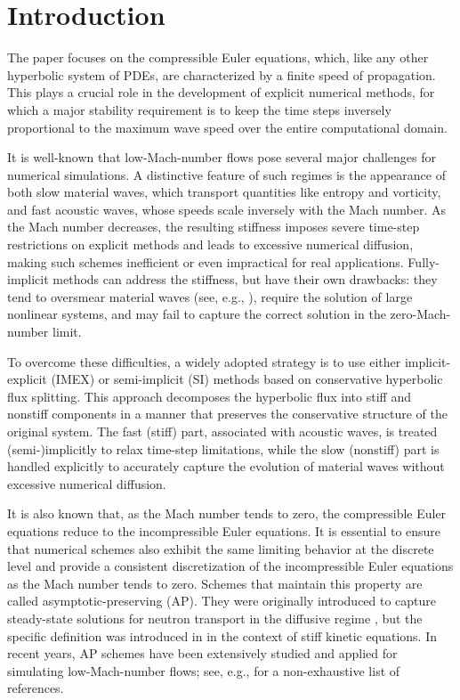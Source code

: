 \documentclass[A4paper,12pt,twoside]{article}
\numberwithin{equation}{section}
\numberwithin{figure}{section}
\numberwithin{table}{section}
\begin{document}
\section{Introduction}%
The paper focuses on the compressible Euler equations, which, like any other hyperbolic system of PDEs, are characterized by a finite speed
of propagation. This plays a crucial role in the development of explicit numerical methods, for which a major stability requirement is to
keep the time steps inversely proportional to the maximum wave speed over the entire computational domain.

It is well-known that low-Mach-number flows pose several major challenges for numerical simulations. A distinctive feature of such regimes
is the appearance of both slow material waves, which transport quantities like entropy and vorticity, and fast acoustic waves, whose speeds
scale inversely with the Mach number. As the Mach number decreases, the resulting stiffness imposes severe time-step restrictions on
explicit methods and leads to excessive numerical diffusion, making such schemes inefficient or even impractical for real applications.
Fully-implicit methods can address the stiffness, but have their own drawbacks: they tend to oversmear material waves (see, e.g.,
\cite{boscarino2018all}), require the solution of large nonlinear systems, and may fail to capture the correct solution in the
zero-Mach-number limit.

To overcome these difficulties, a widely adopted strategy is to use either implicit-explicit (IMEX) or semi-implicit (SI) methods based on
conservative hyperbolic flux splitting. This approach decomposes the hyperbolic flux into stiff and nonstiff components in a manner that
preserves the conservative structure of the original system. The fast (stiff) part, associated with acoustic waves, is treated
(semi-)implicitly to relax time-step limitations, while the slow (nonstiff) part is handled explicitly to accurately capture the evolution
of material waves without excessive numerical diffusion.

It is also known that, as the Mach number tends to zero, the compressible Euler equations reduce to the incompressible Euler equations. It
is essential to ensure that numerical schemes also exhibit the same limiting behavior at the discrete level and provide a consistent
discretization of the incompressible Euler equations as the Mach number tends to zero. Schemes that maintain this property are called
asymptotic-preserving (AP). They were originally introduced to capture steady-state solutions for neutron transport in the diffusive regime
\cite{LMM,LarMor}, but the specific definition was introduced in \cite{GJL,jin1999efficient,Kla99} in the context of stiff kinetic
equations. In recent years, AP schemes have been extensively studied and applied for simulating low-Mach-number flows; see, e.g.,
\cite{AllVig,boscarino2019high,boscarino2018all,BDLTV,CGK,cordier2012asymptotic,DJL,degond2011all,DLMV,dimarco2017study,haack2012all,Kle95,noelle2014weakly,Tang12,TorVaz,zeifang2020novel}
for a non-exhaustive list of references.
\end{document}
